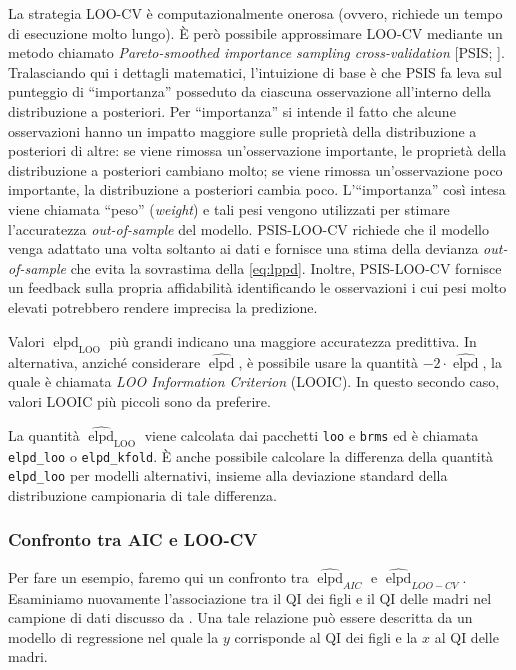 \documentclass[
  10pt,
  italian,
  a4paper,
  extrafontsizes,onecolumn,openright
  ]{memoir}
\DeclareMathOperator{\elpd}{elpd} %
\DeclareMathOperator{\LOO}{LOO} %
\theoremstyle{definition}
\theoremstyle{definition}
\theoremstyle{definition}
\theoremstyle{definition}
\theoremstyle{remark}
\begin{document}
La strategia LOO-CV è computazionalmente onerosa (ovvero, richiede un tempo di esecuzione molto lungo). È però possibile approssimare LOO-CV mediante un metodo chiamato \emph{Pareto-smoothed importance sampling cross-validation} {[}PSIS; \textcite{vehtari2017practical}{]}. Tralasciando qui i dettagli matematici, l'intuizione di base è che PSIS fa leva sul punteggio di ``importanza'' posseduto da ciascuna osservazione all'interno della distribuzione a posteriori. Per ``importanza'' si intende il fatto che alcune osservazioni hanno un impatto maggiore sulle proprietà della distribuzione a posteriori di altre: se viene rimossa un'osservazione importante, le proprietà della distribuzione a posteriori cambiano molto; se viene rimossa un'osservazione poco importante, la distribuzione a posteriori cambia poco.
L'``importanza'' così intesa viene chiamata ``peso'' (\emph{weight}) e tali pesi vengono utilizzati per stimare l'accuratezza \emph{out-of-sample} del modello.
PSIS-LOO-CV richiede che il modello venga adattato una volta soltanto ai dati e fornisce una stima della devianza \emph{out-of-sample} che evita la sovrastima della \eqref{eq:lppd}. Inoltre, PSIS-LOO-CV fornisce un feedback sulla propria affidabilità identificando le osservazioni i cui pesi molto elevati potrebbero rendere imprecisa la predizione.

Valori \(\widehat{\elpd}_{\LOO}\) più grandi indicano una maggiore accuratezza predittiva. In alternativa, anziché considerare \(\widehat{\elpd}\), è possibile usare la quantità \(-2 \cdot \widehat{\elpd}\),
la quale è chiamata \emph{LOO Information Criterion} (LOOIC). In questo secondo caso, valori LOOIC più piccoli sono da preferire.

La quantità \(\widehat{\elpd}_{\LOO}\) viene calcolata dai pacchetti \texttt{loo} e \texttt{brms} ed è chiamata \texttt{elpd\_loo} o \texttt{elpd\_kfold}. È anche possibile calcolare la differenza della quantità \texttt{elpd\_loo} per modelli alternativi, insieme alla deviazione standard della distribuzione campionaria di tale differenza.

\hypertarget{confronto-tra-aic-e-loo-cv}{%
\subsubsection{Confronto tra AIC e LOO-CV}\label{confronto-tra-aic-e-loo-cv}}

Per fare un esempio, faremo qui un confronto tra \(\widehat{\elpd}_{AIC}\) e \(\widehat{\elpd}_{LOO-CV}\). Esaminiamo nuovamente l'associazione tra il QI dei figli e il QI delle madri nel campione di dati discusso da \textcite{gelman2020regression}. Una tale relazione può essere descritta da un modello di regressione nel quale la \(y\) corrisponde al QI dei figli e la \(x\) al QI delle madri.
\end{document}
